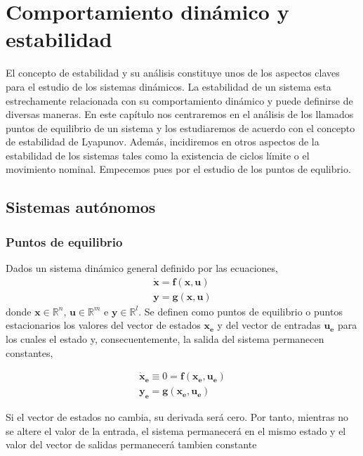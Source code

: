 \chapter{Comportamiento dinámico y estabilidad}
El concepto de estabilidad y su análisis constituye unos de los aspectos claves para el estudio de los sistemas dinámicos. La estabilidad de un sistema esta estrechamente relacionada con su comportamiento dinámico y puede definirse de diversas maneras. En este capítulo nos centraremos en el análisis de los llamados puntos de equilibrio de un sistema y los estudiaremos de acuerdo con el concepto de estabilidad de Lyapunov. Además, incidiremos en otros aspectos de la estabilidad de los sistemas tales como la existencia de ciclos límite o el movimiento nominal. Empecemos pues por el estudio de los puntos de equlibrio.

\section{Sistemas autónomos}

\subsection{Puntos de equilibrio} 
\begin{definition} Dados un sistema dinámico general definido por las ecuaciones,
\begin{align}
\mathbf{\dot{x}} = \mathbf{f}(\mathbf{x},\mathbf{u})\\
\mathbf{y} = \mathbf{g}(\mathbf{x},\mathbf{u})
\end{align}
donde $\mathbf{x} \in \mathbb{R}^n$, $\mathbf{u} \in \mathbb{R}^m$ e $\mathbf{y} \in \mathbb{R}^l$. Se definen como puntos de equilibrio o puntos estacionarios los valores del vector de estados $\mathbf{x_e}$ y del vector de entradas $\mathbf{u_e}$ para los cuales el estado y, consecuentemente, la salida del sistema permanecen constantes,

\begin{align}
\mathbf{\dot{x}_e} \equiv 0 = \mathbf{f}(\mathbf{x_e},\mathbf{u_e})\\
\mathbf{y_e} = \mathbf{g}(\mathbf{x_e},\mathbf{u_e})
\end{align}
\end{definition}

Si el vector de estados no cambia, su derivada será cero. Por tanto, mientras no se altere el valor de la entrada, el sistema permanecerá en el mismo estado y el valor del vector de salidas permanecerá tambien constante

